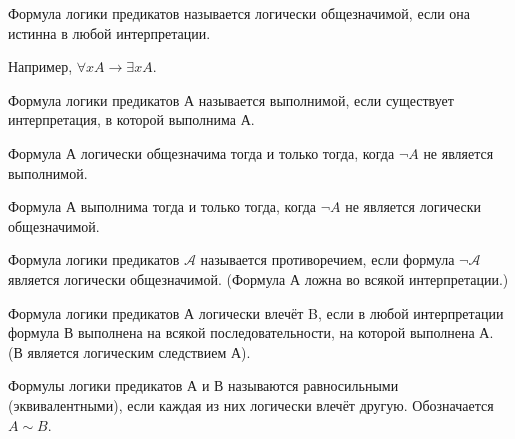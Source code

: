 \begin{definition}
	Формула логики предикатов называется логически общезначимой, если она
	истинна в любой интерпретации. 
\end{definition}

Например, $\forall xA \to \exists xA$.
\begin{definition}
	Формула логики предикатов А называется выполнимой, если существует
	интерпретация, в которой выполнима А.
\end{definition}

\begin{proposition}
Формула А логически общезначима тогда и только тогда, когда $\lnot A$ не является
выполнимой.
\end{proposition}

\begin{proposition}
	Формула А выполнима тогда и только тогда, когда $\lnot A$ не является
	логически общезначимой.
\end{proposition}

\begin{definition}
	Формула логики предикатов $\mathcal{A}$ называется противоречием, если
	формула $\lnot \mathcal{A}$ является логически общезначимой. (Формула А
	ложна во всякой интерпретации.)
\end{definition}

\begin{definition}
	Формула логики предикатов А логически влечёт B, если в любой
	интерпретации формула В выполнена на всякой последовательности, на
	которой выполнена А. (В является логическим следствием А).
\end{definition}

\begin{definition}
	Формулы логики предикатов А и В называются равносильными
	(эквивалентными), если каждая из них логически влечёт другую.
	Обозначается $A \sim B$.
\end{definition}
